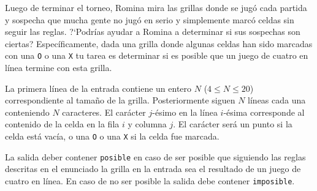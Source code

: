 \documentclass{oci}
\begin{document}
\begin{problemDescription}
\begin{center}
  \end{center}

  Luego de terminar el torneo, Romina mira
  las grillas donde se jugó cada partida
  y sospecha que mucha gente no jugó en serio y
  simplemente marcó celdas sin seguir las reglas.
  ?`Podrías ayudar a Romina a determinar si sus sospechas
  son ciertas?
  Específicamente, dada una grilla donde algunas
  celdas han sido marcadas con una \texttt{O} o una \texttt{X}
  tu tarea es determinar si es posible que un juego de cuatro en
  línea termine con esta grilla.
\end{problemDescription}

\begin{inputDescription}
  La primera línea de la entrada contiene un entero $N$ ($4\leq N \leq 20$)
  correspondiente
  al tamaño de la grilla.
  Posteriormente siguen $N$ líneas cada una conteniendo $N$ caracteres.
  El carácter $j$-ésimo en la línea $i$-ésima corresponde al contenido
  de la celda en la fila $i$ y columna $j$.
  El carácter será un punto si la celda está vacía, o
  una \texttt{O} o una \texttt{X} si la celda fue marcada.
\end{inputDescription}

\begin{outputDescription}
  La salida deber contener \texttt{posible} en caso de ser posible
  que siguiendo las reglas descritas en el enunciado la grilla en la
  entrada sea el resultado de un juego de cuatro en línea.
  En caso de no ser posible la salida debe contener \texttt{imposible}.
\end{outputDescription}
\end{document}
